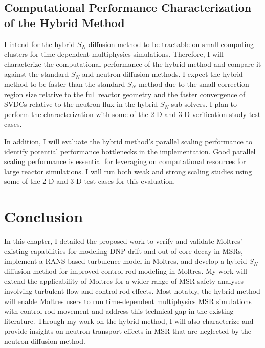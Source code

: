 \subsection{Computational Performance Characterization of the Hybrid Method}

I intend for the hybrid $S_N$-diffusion method to be tractable on small computing clusters for
time-dependent multiphysics simulations. Therefore, I will characterize the computational
performance of the hybrid method and compare it against the standard $S_N$ and neutron diffusion
methods. I expect the hybrid method to be faster than the standard $S_N$ method due to the small
correction region size relative to the full reactor geometry and the faster convergence of
\glspl{SVDC} relative to the neutron flux in the hybrid $S_N$ sub-solvers. I plan to perform the
characterization with some of the 2-D and 3-D verification study test cases.

In addition, I will evaluate the hybrid method's parallel scaling performance to identify potential
performance bottlenecks in the implementation. Good parallel scaling performance is essential for
leveraging on computational resources for large reactor simulations. I will run both weak and
strong scaling studies using some of the 2-D and 3-D test cases for this evaluation.

\section{Conclusion} \label{sec:devel-conclusion}

In this chapter, I detailed the proposed work to verify and validate Moltres' existing capabilities
for modeling \gls{DNP} drift and out-of-core decay in \glspl{MSR}, implement a \gls{RANS}-based
turbulence model in Moltres, and develop a hybrid $S_N$-diffusion method for improved control
rod modeling in Moltres. My work will extend the applicability of Moltres for a wider range of
MSR safety analyses involving turbulent flow and control rod effects. Most notably, the hybrid
method will enable Moltres users to run time-dependent multiphysics \gls{MSR} simulations with
control rod movement and address this technical gap in the existing literature. Through my work on
the hybrid method, I will also characterize and provide insights on neutron transport effects in
\gls{MSR} that are neglected by the neutron diffusion method.
